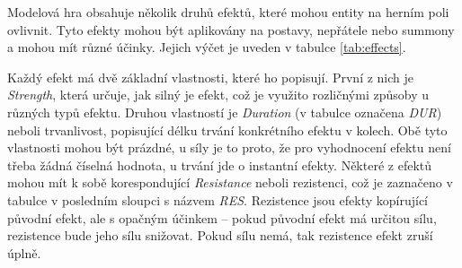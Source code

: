 Modelová hra obsahuje několik druhů efektů, které mohou entity na herním poli ovlivnit. Tyto efekty mohou být aplikovány na postavy, nepřátele nebo summony a mohou mít různé účinky. Jejich výčet je uveden v tabulce \ref{tab:effects}.

Každý efekt má dvě základní vlastnosti, které ho popisují. První z nich je \textit{Strength}, která určuje, jak silný je efekt, což je využito rozličnými způsoby u různých typů efektu. Druhou vlastností je \textit{Duration} (v tabulce označena \textit{DUR}) neboli trvanlivost, popisující délku trvání konkrétního efektu v kolech. Obě tyto vlastnosti mohou být prázdné, u síly je to proto, že pro vyhodnocení efektu není třeba žádná číselná hodnota, u trvání jde o instantní efekty. Některé z efektů mohou mít k sobě korespondující \textit{Resistance} neboli rezistenci, což je zaznačeno v tabulce v posledním sloupci s názvem \textit{RES}. Rezistence jsou efekty kopírující původní efekt, ale s opačným účinkem -- pokud původní efekt má určitou sílu, rezistence bude jeho sílu snižovat. Pokud sílu nemá, tak rezistence efekt zruší úplně.


